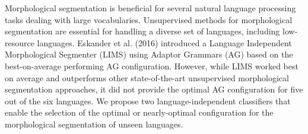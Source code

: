 Morphological segmentation is beneficial for several natural language processing tasks dealing with large vocabularies. Unsupervised methods for morphological segmentation are essential for handling a diverse set of languages, including low-resource languages. Eskander et al. (2016) introduced a Language Independent Morphological Segmenter (LIMS) using Adaptor Grammars (AG) based on the best-on-average performing AG configuration. However, while LIMS worked best on average and outperforms other state-of-the-art unsupervised morphological segmentation approaches, it did not provide the optimal AG configuration for five out of the six languages. We propose two language-independent classifiers that enable the selection of the optimal or nearly-optimal configuration for the morphological segmentation of unseen languages.
